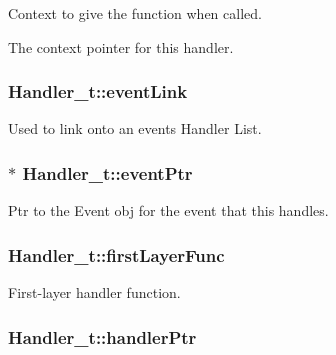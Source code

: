 Context to give the function when called. 

The context pointer for this handler. 
\subsubsection[{\texorpdfstring{event\+Link}{eventLink}}]{ Handler\+\_\+t\+::event\+Link}\hypertarget{struct_handler__t_a6153005130e7a0bb349252e79f9820d1}{}\label{struct_handler__t_a6153005130e7a0bb349252e79f9820d1}


Used to link onto an event\textquotesingle{}s Handler List. 

\subsubsection[{\texorpdfstring{event\+Ptr}{eventPtr}}]{$\ast$ Handler\+\_\+t\+::event\+Ptr}\hypertarget{struct_handler__t_ab07c56e4bc6c2e2c48a7b18aa373ffc5}{}\label{struct_handler__t_ab07c56e4bc6c2e2c48a7b18aa373ffc5}


Ptr to the Event obj for the event that this handles. 

\subsubsection[{\texorpdfstring{first\+Layer\+Func}{firstLayerFunc}}]{ Handler\+\_\+t\+::first\+Layer\+Func}\hypertarget{struct_handler__t_a4de499c986f4959415372380c46aa0ae}{}\label{struct_handler__t_a4de499c986f4959415372380c46aa0ae}


First-\/layer handler function. 

\subsubsection[{\texorpdfstring{handler\+Ptr}{handlerPtr}}]{ Handler\+\_\+t\+::handler\+Ptr}\hypertarget{struct_handler__t_adae8221a05f19b32b02aefc73ce4bf9e}{}\label{struct_handler__t_adae8221a05f19b32b02aefc73ce4bf9e}


